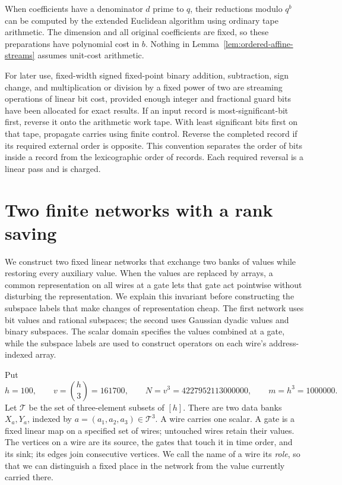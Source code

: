 \documentclass[11pt]{article}
\theoremstyle{definition}
\begin{document}
When coefficients have a denominator $d$ prime to $q$, their reductions
modulo $q^b$ can be computed by the extended Euclidean algorithm using
ordinary tape arithmetic.  The dimension and all original coefficients
are fixed, so these preparations have polynomial cost in $b$.  Nothing
in Lemma~\ref{lem:ordered-affine-streams} assumes unit-cost arithmetic.

For later use, fixed-width signed fixed-point binary addition,
subtraction, sign change, and multiplication or division by a fixed
power of two are streaming operations of linear bit cost, provided
enough integer and fractional guard bits have been allocated for exact
results. If an input record is most-significant-bit first, reverse it onto
the arithmetic work tape. With least significant bits first on that tape,
propagate carries using finite control. Reverse the completed record if
its required external order is opposite.
This convention separates the order of bits inside a record from the
lexicographic order of records. Each required reversal is a linear pass
and is charged.
 \section{Two finite networks with a rank saving}
\label{sec:finite-networks}

We construct two fixed linear networks that exchange two banks of values
while restoring every auxiliary value.  When the values are replaced by
arrays, a common representation on all wires at a gate lets that gate act
pointwise without disturbing the representation.  We explain this invariant
before constructing the subspace labels that make changes of representation
cheap.  The first network uses bit values and rational subspaces; the second
uses Gaussian dyadic values and binary subspaces.  The scalar domain specifies
the values combined at a gate, while the subspace labels are used to construct operators
on each wire's address-indexed array.

Put
\[
 h=100,\qquad v=\binom h3=161700,\qquad
 N=v^3=4227952113000000,\qquad m=h^3=1000000.
\]
Let $\mathcal T$ be the set of three-element subsets of $[h]$.
There are two data banks $X_a,Y_a$, indexed by
$a=(a_1,a_2,a_3)\in\mathcal T^3$.
A wire carries one scalar.  A gate is a fixed linear map on a specified
set of wires; untouched wires retain their values.  The vertices on a
wire are its source, the gates that touch it in time order, and its sink;
its edges join consecutive vertices.  We call the name of a wire its
\emph{role}, so that we can distinguish a fixed place in the network
from the value currently carried there.
\end{document}

